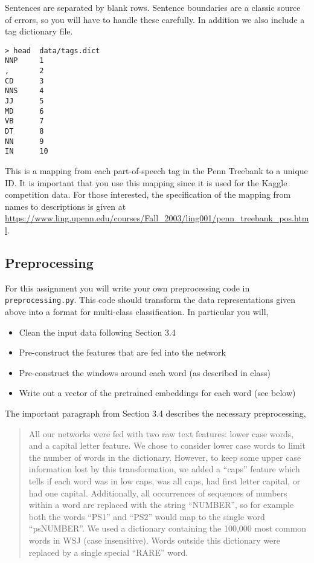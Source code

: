 \documentclass[11pt]{article}
\begin{document}
\noindent Sentences are separated by blank rows. Sentence boundaries are a
classic source of errors, so you will have to handle these carefully. In addition we also include a tag dictionary file. 

\begin{verbatim}
> head  data/tags.dict 
NNP     1
,       2
CD      3
NNS     4
JJ      5
MD      6
VB      7
DT      8
NN      9
IN      10
\end{verbatim}

This is a mapping from each part-of-speech tag in the Penn Treebank to
a unique ID. It is important that you use this mapping since it 
is used for the Kaggle competition data. For those interested, the
specification of the mapping from names to descriptions is given at
\url{https://www.ling.upenn.edu/courses/Fall_2003/ling001/penn_treebank_pos.html}.


\subsection{Preprocessing}

For this assignment you will write your own preprocessing code
in \texttt{preprocessing.py}. This code should transform the
data representations given above into a format for multi-class
classification. In particular you will,

\begin{itemize}
\item Clean the input data following Section 3.4
\item Pre-construct the features that are fed into the network
\item Pre-construct the windows around each word (as described in class)
\item Write out a vector of the pretrained embeddings for each word (see below)
\end{itemize}

The important paragraph from Section 3.4 describes the necessary
preprocessing,

\begin{quote}
  All our networks were fed with two raw text features: lower case
  words, and a capital letter feature. We chose to consider lower case
  words to limit the number of words in the dictionary. However, to
  keep some upper case information lost by this transformation, we
  added a “caps” feature which tells if each word was in low caps, was
  all caps, had first letter capital, or had one
  capital. Additionally, all occurrences of sequences of numbers
  within a word are replaced with the string “NUMBER”, so for example
  both the words “PS1” and “PS2” would map to the single word
  “psNUMBER”. We used a dictionary containing the 100,000 most common
  words in WSJ (case insensitive). Words outside this dictionary were
  replaced by a single special “RARE” word.
\end{quote}
\end{document}
